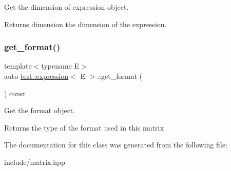 Get the dimension of expression object. 

\begin{DoxyReturn}{Returns}
dimension the dimension of the expression. 
\end{DoxyReturn}
\mbox{\label{classtest_1_1expression_a6e572103ab041dc6fb445801c0120816}} 
\subsubsection{\texorpdfstring{get\_format()}{get\_format()}}
{\footnotesize\ttfamily template$<$typename E$>$ \\
auto \mbox{\hyperlink{classtest_1_1expression}{test\+::expression}}$<$ E $>$\+::get\+\_\+format (\begin{DoxyParamCaption}{ }\end{DoxyParamCaption}) const\hspace{0.3cm}{\ttfamily [inline]}}



Get the format object. 

\begin{DoxyReturn}{Returns}
the type of the format used in this matrix 
\end{DoxyReturn}


The documentation for this class was generated from the following file\+:\begin{DoxyCompactItemize}
\item 
include/matrix.\+hpp\end{DoxyCompactItemize}
